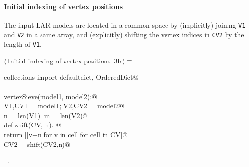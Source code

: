 \documentclass[11pt,oneside]{article}	%
\begin{document}
\paragraph{Initial indexing of vertex positions}
The input LAR models are located in a common space by (implicitly) joining \texttt{V1} and \texttt{V2} in a same array, and (explicitly) shifting the vertex indices in \texttt{CV2} by the length of \texttt{V1}.
\begin{flushleft} \small \label{scrap4}
\protect{}$\langle\,$Initial indexing of vertex positions\nobreak\ {\footnotesize 3b}$\,\rangle\equiv$
\vspace{-1ex}
\begin{list}{}{} \item
\mbox{}\verb@from collections import defaultdict, OrderedDict@\\
\mbox{}\verb@@\\
\mbox{}\verb@def vertexSieve(model1, model2):@\\
\mbox{}\verb@   V1,CV1 = model1; V2,CV2 = model2@\\
\mbox{}\verb@   n = len(V1); m = len(V2)@\\
\mbox{}\verb@   def shift(CV, n): @\\
\mbox{}\verb@      return [[v+n for v in cell]for cell in CV]@\\
\mbox{}\verb@   CV2 = shift(CV2,n)@\\
\mbox{}\verb@@{\NWsep}
\end{list}
\vspace{-1ex}
\footnotesize\addtolength{\baselineskip}{-1ex}
\begin{list}{}{\setlength{\itemsep}{-\parsep}\setlength{\itemindent}{-\leftmargin}}
\item \NWtxtMacroRefIn\ .
\end{list}
\end{flushleft}
\end{document}

